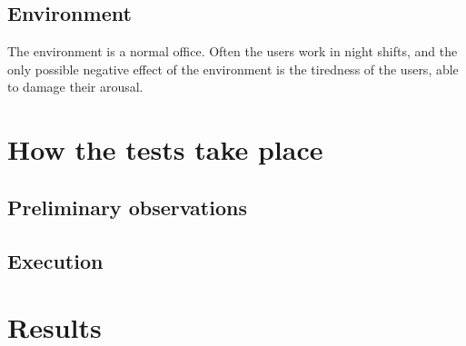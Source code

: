 \subsection{Environment }
The environment is a normal office. Often the users work in night shifts, and the only possible negative effect of the environment is the tiredness of the users, able to damage their arousal. 

\section{How the tests take place} 
\subsection{Preliminary observations}
\subsection{Execution}	
\section{Results}
